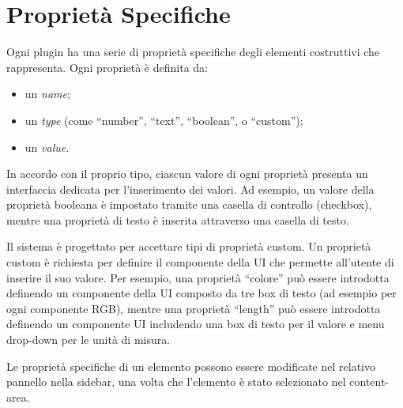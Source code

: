 \section{Propriet\`a Specifiche}
\label{sec:chapter_3_section_3}

\noindent

Ogni plugin ha una serie di proprietà specifiche degli elementi costruttivi che rappresenta.
Ogni propriet\`a \`e definita da:
\begin{itemize}
  \item un \emph{name};
  \item un \emph{type} (come ``number'', ``text'', ``boolean'', o ``custom'');
  \item un \emph{value}.
\end{itemize}
In accordo con il proprio tipo, ciascun valore di ogni proprietà presenta un interfaccia dedicata per l'inserimento dei valori.
Ad esempio, un valore della proprietà booleana è impostato tramite una casella di controllo (checkbox),
mentre una proprietà di testo è inserita attraverso una casella di testo.

Il sistema \`e progettato per accettare tipi di propriet\`a custom. Un propriet\`a custom è richiesta per definire
il componente della UI che permette all'utente di inserire il suo valore.
Per esempio, una propriet\`a ``colore'' pu\`o essere introdotta definendo un componente della UI composto da tre box di testo
(ad esempio per ogni componente RGB), mentre una propriet\`a ``length'' pu\`o essere introdotta definendo un componente UI
includendo una box di testo per il valore e menu drop-down per le unità di misura.

Le propriet\`a specifiche di un elemento possono essere modificate nel relativo pannello nella sidebar, una volta che l'elemento
\`e stato selezionato nel content-area.
\newpage




